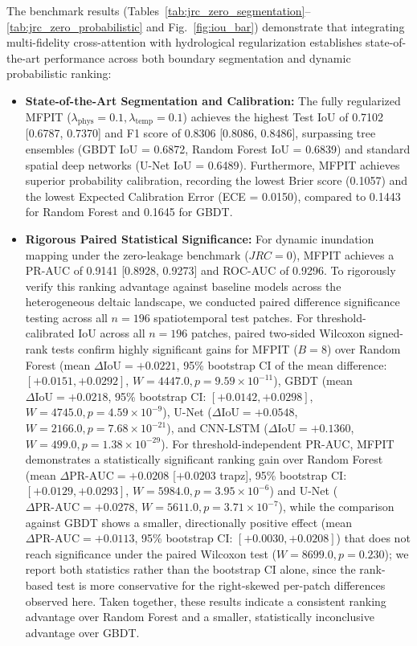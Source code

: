 \documentclass[journal]{IEEEtran}
\begin{document}
The benchmark results (Tables~\ref{tab:jrc_zero_segmentation}--\ref{tab:jrc_zero_probabilistic} and Fig.~\ref{fig:iou_bar}) demonstrate that integrating multi-fidelity cross-attention with hydrological regularization establishes state-of-the-art performance across both boundary segmentation and dynamic probabilistic ranking:
\begin{itemize}
    \item \textbf{State-of-the-Art Segmentation and Calibration:} The fully regularized MFPIT ($\lambda_{\text{phys}} = 0.1, \lambda_{\text{temp}} = 0.1$) achieves the highest Test IoU of 0.7102 [0.6787, 0.7370] and F1 score of 0.8306 [0.8086, 0.8486], surpassing tree ensembles (GBDT IoU = 0.6872, Random Forest IoU = 0.6839) and standard spatial deep networks (U-Net IoU = 0.6489). Furthermore, MFPIT achieves superior probability calibration, recording the lowest Brier score (0.1057) and the lowest Expected Calibration Error (ECE = 0.0150), compared to 0.1443 for Random Forest and 0.1645 for GBDT.
    \item \textbf{Rigorous Paired Statistical Significance:} For dynamic inundation mapping under the zero-leakage benchmark ($JRC=0$), MFPIT achieves a PR-AUC of 0.9141 [0.8928, 0.9273] and ROC-AUC of 0.9296. To rigorously verify this ranking advantage against baseline models across the heterogeneous deltaic landscape, we conducted paired difference significance testing across all $n = 196$ spatiotemporal test patches. For threshold-calibrated IoU across all $n = 196$ patches, paired two-sided Wilcoxon signed-rank tests confirm highly significant gains for MFPIT ($B=8$) over Random Forest (mean $\Delta\text{IoU} = +0.0221$, 95\% bootstrap CI of the mean difference: $[+0.0151, +0.0292]$, $W = 4447.0, p = 9.59 \times 10^{-11}$), GBDT (mean $\Delta\text{IoU} = +0.0218$, 95\% bootstrap CI: $[+0.0142, +0.0298]$, $W = 4745.0, p = 4.59 \times 10^{-9}$), U-Net ($\Delta\text{IoU} = +0.0548$, $W = 2166.0, p = 7.68 \times 10^{-21}$), and CNN-LSTM ($\Delta\text{IoU} = +0.1360$, $W = 499.0, p = 1.38 \times 10^{-29}$). For threshold-independent PR-AUC, MFPIT demonstrates a statistically significant ranking gain over Random Forest (mean $\Delta \text{PR-AUC} = +0.0208$ [$+0.0203$ trapz], 95\% bootstrap CI: $[+0.0129, +0.0293]$, $W = 5984.0, p = 3.95 \times 10^{-6}$) and U-Net ($\Delta\text{PR-AUC} = +0.0278$, $W = 5611.0, p = 3.71 \times 10^{-7}$), while the comparison against GBDT shows a smaller, directionally positive effect (mean $\Delta \text{PR-AUC} = +0.0113$, 95\% bootstrap CI: $[+0.0030, +0.0208]$) that does not reach significance under the paired Wilcoxon test ($W = 8699.0, p = 0.230$); we report both statistics rather than the bootstrap CI alone, since the rank-based test is more conservative for the right-skewed per-patch differences observed here. Taken together, these results indicate a consistent ranking advantage over Random Forest and a smaller, statistically inconclusive advantage over GBDT.

\end{itemize}
\end{document}
